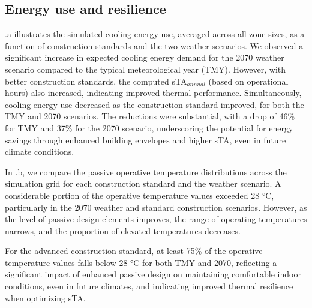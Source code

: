 \subsection{Energy use and resilience}

.a illustrates the simulated cooling energy use, averaged across all zone sizes, as a function of construction standards and the two weather scenarios. We observed a significant increase in expected cooling energy demand for the 2070 weather scenario compared to the typical meteorological year (TMY). However, with better construction standards, the computed sTA$_{annual}$ (based on operational hours) also increased, indicating improved thermal performance. Simultaneously, cooling energy use decreased as the construction standard improved, for both the TMY and 2070 scenarios. The reductions were substantial, with a drop of 46\% for TMY and 37\% for the 2070 scenario, underscoring the potential for energy savings through enhanced building envelopes and higher sTA, even in future climate conditions.

In .b, we compare the passive operative temperature distributions across the simulation grid for each construction standard and the weather scenario. A considerable portion of the operative temperature values exceeded 28 °C, particularly in the 2070 weather and standard construction scenarios. However, as the level of passive design elements improves, the range of operating temperatures narrows, and the proportion of elevated temperatures decreases.

For the advanced construction standard, at least 75\% of the operative temperature values falls below 28 °C for both TMY and 2070, reflecting a significant impact of enhanced passive design on maintaining comfortable indoor conditions, even in future climates, and indicating improved thermal resilience when optimizing sTA.


